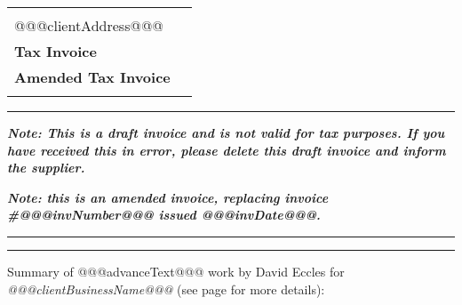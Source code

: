 \documentclass[10pt,a4paper,twoside]{letter}
\begin{document}

\hspace{\fill}

\begin{tabular}{lr}
  \begin{minipage}[c]{0.55\textwidth}
    @@@clientName@@@\\%
    @@@clientAddress@@@
  \end{minipage} &
  \begin{minipage}[c]{0.4\textwidth}
    \begin{center}
      \begin{framed}
        \huge{\textbf{Draft Invoice}}\\%
        \Huge{\textbf{Tax Invoice}}\\%
        \large{\textbf{Amended Tax Invoice}}\\%
      \end{framed}
    \end{center}
  \end{minipage}%
\end{tabular}

\rule{\linewidth}{1pt}

\leftskip=10pt

\emph{\textbf{Note: This is a draft invoice and is not valid %
    for tax purposes. If you have received this in error, %
    please delete this draft invoice and inform the supplier.}}%

\emph{\textbf{Note: this is an amended invoice, replacing %
    invoice \#@@@invNumber@@@ issued @@@invDate@@@.}}%

\leftskip=0pt

\rule{\linewidth}{1pt} %
\rule{\linewidth}{1pt} %

\leftskip=10pt

Summary of @@@advanceText@@@ work by David Eccles for
\emph{@@@clientBusinessName@@@} (see page
\pageref{sec:sub-job-details} for more details):
\end{document}
